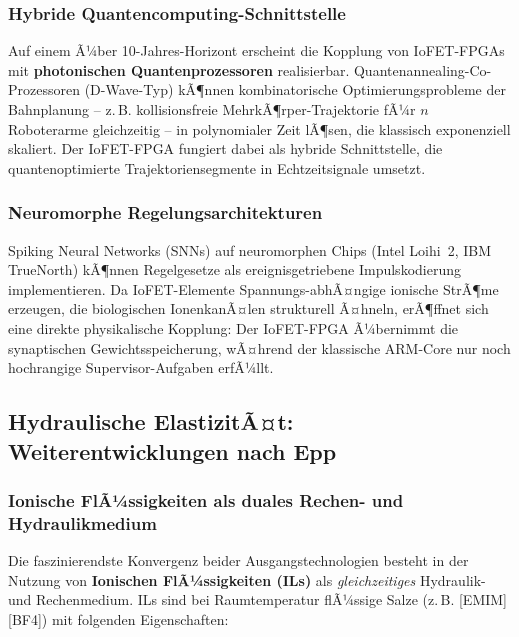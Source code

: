 ﻿\documentclass[a4paper,12pt]{scrreprt}
\theoremstyle{definition}
\begin{document}
\subsubsection{Hybride Quantencomputing-Schnittstelle}

Auf einem Ã¼ber 10-Jahres-Horizont erscheint die Kopplung von
IoFET-FPGAs mit \textbf{photonischen Quantenprozessoren} realisierbar.
Quantenannealing-Co-Prozessoren (D-Wave-Typ) kÃ¶nnen kombinatorische
Optimierungsprobleme der Bahn\-planung -- z.\,B. kollisionsfreie
MehrkÃ¶rper-Trajektorie fÃ¼r $n$ Roboterarme gleichzeitig --
in polynomialer Zeit lÃ¶sen, die klassisch exponenziell skaliert.
Der IoFET-FPGA fungiert dabei als hybride Schnittstelle, die
quantenoptimierte Trajektoriensegmente in Echtzeitsignale umsetzt.

\subsubsection{Neuromorphe Regelungsarchitekturen}

Spiking Neural Networks (SNNs) auf neuromorphen Chips
(Intel Loihi~2, IBM TrueNorth) kÃ¶nnen Regelgesetze als
ereignisgetriebene Impulskodierung implementieren.
Da IoFET-Elemente Spannungs-abhÃ¤ngige ionische StrÃ¶me erzeugen,
die biologischen IonenkanÃ¤len strukturell Ã¤hneln, erÃ¶ffnet
sich eine direkte physikalische Kopplung: Der IoFET-FPGA
Ã¼bernimmt die synaptischen Gewichtsspeicherung, wÃ¤hrend
der klassische ARM-Core nur noch hochrangige Supervisor-Aufgaben erfÃ¼llt.

\subsection{Hydraulische ElastizitÃ¤t: Weiterentwicklungen nach Epp}

\subsubsection{Ionische FlÃ¼ssigkeiten als duales Rechen- und Hydraulikmedium}

Die faszinierendste Konvergenz beider Ausgangstechnologien besteht in
der Nutzung von \textbf{Ionischen FlÃ¼ssigkeiten (ILs)} als \emph{gleichzeitiges}
Hydraulik- und Rechenmedium. ILs sind bei Raumtemperatur flÃ¼ssige
Salze (z.\,B. \mbox{[EMIM][BF4]}) mit folgenden Eigenschaften:
\end{document}

